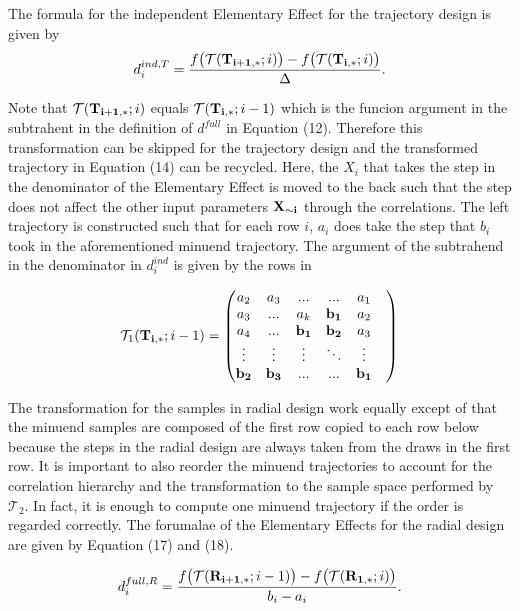 \documentclass[a4paper,12pt]{article}
\begin{document}
\noindent
The formula for the independent Elementary Effect for the trajectory design is given by
\begin{align}
d_i^{ind, T} = \frac{f\big(\mathcal{T}(\bold{T_{i+1,*}}; i)\big) - f\big(\mathcal{T}(\bold{T_{i,*}}; i)\big)}{\Delta}.
\end{align}

Note that $\mathcal{T}(\bold{T_{i+1,*}}; i)$ equals $\mathcal{T}(\bold{T_{i,*}}; i-1)$ which is the funcion argument in the subtrahent in the definition of $d^{full}$ in Equation (12). Therefore this transformation can be skipped for the trajectory design and the transformed trajectory in Equation (14) can be recycled. Here, the $X_i$ that takes the step in the denominator of the Elementary Effect is moved to the back such that the step does not affect the other input parameters $\bold{X_{\sim i}}$ through the correlations. The left trajectory is constructed such that for each row $i$, $a_i$ does take the step that $b_i$ took in the aforementioned minuend trajectory. The argument of the subtrahend in the denominator in $d_i^{ind}$ is given by the rows in

\begin{align}
\mathcal{T}_1(\bold{T_{i,*}}; i-1)=
\begin{pmatrix}
a_2 & a_3 & ... & ... &  a_1 \\
a_3 & ... & a_k &  \bold{b_1} & a_2 \\
a_4 & ... & \bold{b_1} &  \bold{b_2} & a_3 & \\
\vdots & \vdots & \vdots & 	\ddots &  \vdots\\
\bold{b_2} & \bold{b_{3}} & ... & ... &  \bold{b_{1}}
\end{pmatrix}
\end{align}

\noindent
The transformation for the samples in radial design work equally except of that the minuend samples are composed of the first row copied to each row below because the steps in the radial design are always taken from the draws in the first row. It is important to also reorder the minuend trajectories to account for the correlation hierarchy and the transformation to the sample space performed by $\mathcal{T}_2$. In fact, it is enough to compute one minuend trajectory if the order is regarded correctly. The forumalae of the Elementary Effects for the radial design are given by Equation (17) and (18).

\begin{align}
d_i^{full, R} = \frac{f\big(\mathcal{T}(\bold{R_{i+1,*}}; i-1)\big) - f\big(\mathcal{T}(\bold{R_{1,*}}; i)\big)}{b_i - a_i}.
\end{align}
\end{document}
